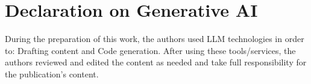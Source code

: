 \section*{Declaration on Generative AI}
During the preparation of this work, the authors used LLM technologies in order to:
Drafting content and Code generation.
After using these tools/services, the authors reviewed and edited the content
as needed and take full responsibility for the publication's content.
